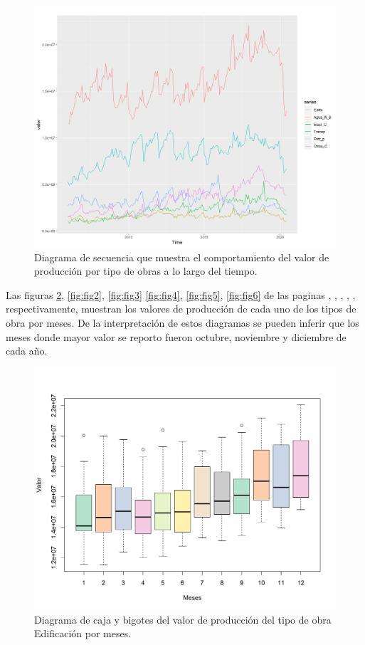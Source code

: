 \documentclass{article}
\begin{document}
\begin{center}
\begin{figure}[H]
\includegraphics[scale=0.65]{series.png}
\caption{Diagrama de secuencia  que muestra el comportamiento del valor de producción por tipo de obras a lo largo del tiempo.}
\label{fig:serie}
\end{figure}
\end{center}
\newpage
Las figuras \ref{fig:fig1}, \ref{fig:fig2}, \ref{fig:fig3} \ref{fig:fig4}, \ref{fig:fig5}, \ref{fig:fig6} de las paginas \pageref{fig:fig1}, \pageref{fig:fig2}, \pageref{fig:fig3}, \pageref{fig:fig4}, \pageref{fig:fig5}, \pageref{fig:fig6} respectivamente, muestran los valores de producción de cada uno de los tipos de obra por meses. De la interpretación de estos diagramas se pueden inferir que los meses donde mayor valor se reporto fueron octubre, noviembre y diciembre de cada año.  
\begin{center}
\begin{figure}[H]
\includegraphics[scale=0.8]{boxplot1.png}
\caption{Diagrama de caja y bigotes del valor de producción del tipo de obra Edificación por meses.}
\label{fig:fig1}
\end{figure}
\end{center}
\end{document}
